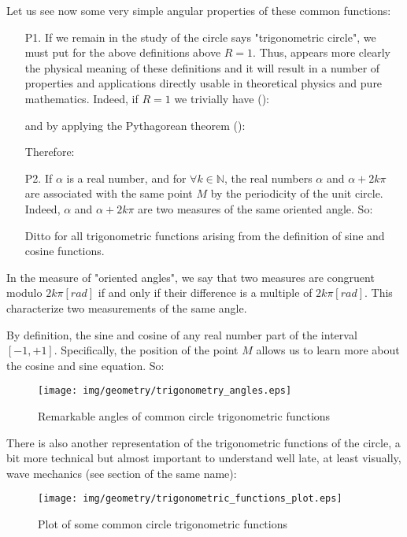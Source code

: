 	Let us see now some very simple angular properties of these common functions:
	\begin{enumerate}
		\item[P1.] If we remain in the study of the circle says "trigonometric circle", we must put for the above definitions above $R=1$. Thus, appears more clearly the physical meaning of these definitions and it will result in a number of properties and applications directly usable in theoretical physics and pure mathematics.
		Indeed, if $R=1$ we trivially have ():
			
		and by applying the Pythagorean theorem ():
		
		Therefore:
		
		\item[P2.] If $\alpha$ is a real number, and for $\forall k \in \mathbb{N}$, the real numbers $\alpha$ and $\alpha + 2k\pi$ are associated with the same point $M$ by the periodicity of the unit circle. Indeed, $\alpha$ and $\alpha + 2k\pi$ are two measures of the same oriented angle. So:
		
	Ditto for all trigonometric functions arising from the definition of sine and cosine functions.
	\end{enumerate}

	\begin{tcolorbox}[title=Remark,colframe=black,arc=10pt]
In the measure of "oriented angles", we say that two measures are congruent modulo $2k\pi [rad]$ if and only if their difference is a multiple of $2k\pi [rad]$. This characterize two measurements of the same angle.
	\end{tcolorbox}
	
	By definition, the sine and cosine of any real number part of the 
 interval $[-1,+1]$. Specifically, the position of the point $M$ allows us to learn more about the cosine and sine equation. So:
 
\begin{figure}[H]
\centering
\texttt{[image: img/geometry/trigonometry\_angles.eps]}
\caption{Remarkable angles of common circle trigonometric functions}
\end{figure}

There is also another representation of the trigonometric functions of the circle, a bit more technical but almost important to understand well late, at least visually,  wave mechanics (see section of the same name):

\begin{figure}[H]
\centering
\texttt{[image: img/geometry/trigonometric\_functions\_plot.eps]}
\caption{Plot of some common circle trigonometric functions}
\end{figure}


